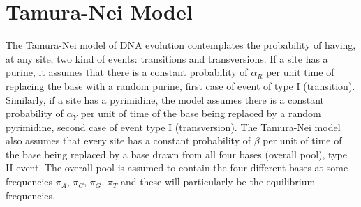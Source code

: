 \documentclass[12pt,twoside]{article}
\begin{document}
\section{Tamura-Nei Model}
The Tamura-Nei model of DNA evolution contemplates the probability of having, at any site, two kind of events: transitions and transversions. If a site has a purine, it assumes that there is a constant probability of $\alpha_{R}$ per unit time of replacing the base with a random purine, first case of event of type I (transition). Similarly, if a site has a pyrimidine, the model assumes there is a constant probability of $\alpha_{Y}$ per unit of time of the base being replaced by a random pyrimidine, second case of event type I (transversion). The Tamura-Nei model also assumes that every site has a constant probability of $\beta$ per unit of time of the base being replaced by a base drawn from all four bases (overall pool), type II event. The overall pool is assumed to contain the four different bases at some frequencies $\pi_{A}$, $\pi_{C}$, $\pi_{G}$, $\pi_{T}$ and these will particularly be the equilibrium frequencies.
\end{document}
